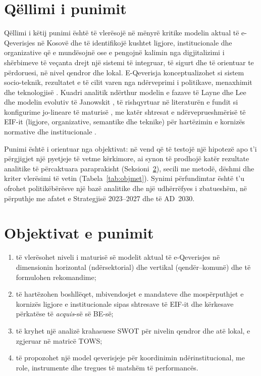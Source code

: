 \documentclass[conference]{IEEEtran}
\begin{document}
\section{Qëllimi i punimit}
\label{sec:qellimi}
Qëllimi i këtij punimi është të vlerësojë në mënyrë kritike modelin aktual
të e-Qeverisjes në Kosovë dhe të identifikojë kushtet ligjore,
institucionale dhe organizative që e mundësojnë ose e pengojnë kalimin nga
digjitalizimi i shërbimeve të veçanta drejt një sistemi të integruar, të
sigurt dhe të orientuar te përdoruesi, në nivel qendror dhe lokal.
E-Qeverisja konceptualizohet si sistem socio-teknik, rezultatet e të cilit
varen nga ndërveprimi i politikave, menaxhimit dhe teknologjisë
\cite{pardo2012}. Kuadri analitik ndërthur modelin e fazave të Layne dhe Lee
\cite{layne2001} dhe modelin evolutiv të Janowskit \cite{janowski2015}, të
rishqyrtuar në literaturën e fundit si konfigurime jo-lineare të maturisë
\cite{iannacci2025}, me katër shtresat e ndërveprueshmërisë të EIF-it
(ligjore, organizative, semantike dhe teknike) për hartëzimin e kornizës
normative dhe institucionale \cite{eif2017}.

Punimi është i orientuar nga objektivat: në vend që të testojë një hipotezë
apo t'i përgjigjet një pyetjeje të vetme kërkimore, ai synon të prodhojë
katër rezultate analitike të përcaktuara paraprakisht (Seksioni~\ref{sec:objektivat}),
secili me metodë, dëshmi dhe kriter vlerësimi të vetin
(Tabela~\ref{tab:objmet}). Synimi përfundimtar është t'u ofrohet
politikëbërësve një bazë analitike dhe një udhërrëfyes i zbatueshëm, në
përputhje me afatet e Strategjisë 2023--2027 dhe të AD~2030.
\section{Objektivat e punimit}
\label{sec:objektivat}
\begin{enumerate}
\renewcommand{\labelenumi}{O\arabic{enumi}:}
\item të vlerësohet niveli i maturisë së modelit aktual të e-Qeverisjes në
dimensionin horizontal (ndërsektorial) dhe vertikal (qendër--komunë) dhe të
formulohen rekomandime;
\item të hartëzohen boshllëqet, mbivendosjet e mandateve dhe mospërputhjet e
kornizës ligjore e institucionale sipas shtresave të EIF-it dhe kërkesave
përkatëse të \textit{acquis}-së së BE-së;
\item të kryhet një analizë krahasuese SWOT për nivelin qendror dhe atë
lokal, e zgjeruar në matricë TOWS;
\item të propozohet një model qeverisjeje për koordinimin ndërinstitucional,
me role, instrumente dhe tregues të matshëm të performancës.
\end{enumerate}
\end{document}
